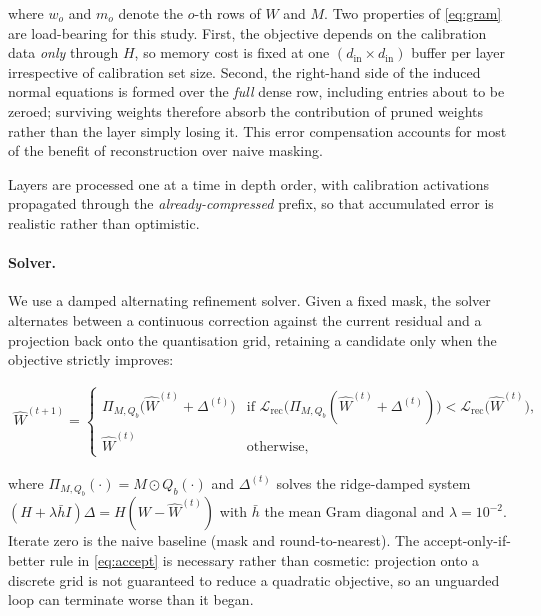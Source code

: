 where $w_o$ and $m_o$ denote the $o$-th rows of $W$ and $M$. Two properties of
\eqref{eq:gram} are load-bearing for this study. First, the objective depends on the
calibration data \emph{only} through $H$, so memory cost is fixed at one
$(d_{\mathrm{in}}\!\times\!d_{\mathrm{in}})$ buffer per layer irrespective of calibration
set size. Second, the right-hand side of the induced normal equations is formed over the
\emph{full} dense row, including entries about to be zeroed; surviving weights therefore
absorb the contribution of pruned weights rather than the layer simply losing it. This error
compensation accounts for most of the benefit of reconstruction over naive masking.

Layers are processed one at a time in depth order, with calibration activations propagated
through the \emph{already-compressed} prefix, so that accumulated error is realistic rather
than optimistic.

\paragraph{Solver.} We use a damped alternating refinement solver. Given a fixed mask, the
solver alternates between a continuous correction against the current residual and a
projection back onto the quantisation grid, retaining a candidate only when the objective
strictly improves:

\begin{align}
  \hat{W}^{(t+1)} =
  \begin{cases}
    \Pi_{M, Q_b}\!\bigl(\hat{W}^{(t)} + \Delta^{(t)}\bigr)
      & \text{if } \mathcal{L}_{\mathrm{rec}}\bigl(\Pi_{M, Q_b}(\hat{W}^{(t)} + \Delta^{(t)})\bigr)
        < \mathcal{L}_{\mathrm{rec}}\bigl(\hat{W}^{(t)}\bigr), \\[4pt]
    \hat{W}^{(t)} & \text{otherwise,}
  \end{cases}
  \label{eq:accept}
\end{align}

where $\Pi_{M,Q_b}(\cdot) = M \odot Q_b(\cdot)$ and $\Delta^{(t)}$ solves the ridge-damped
system $(H + \lambda \bar{h} I)\Delta = H(W - \hat{W}^{(t)})$ with $\bar{h}$ the mean Gram
diagonal and $\lambda = 10^{-2}$. Iterate zero is the naive baseline (mask and
round-to-nearest). The accept-only-if-better rule in \eqref{eq:accept} is necessary rather
than cosmetic: projection onto a discrete grid is not guaranteed to reduce a quadratic
objective, so an unguarded loop can terminate worse than it began.

